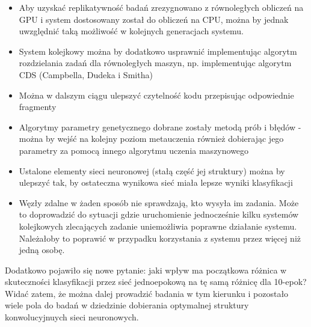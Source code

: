\begin{itemize}
  \item Aby uzyskać replikatywność badań zrezygnowano z równoległych obliczeń na GPU i system dostosowany został do obliczeń na CPU, można by jednak uwzględnić taką możliwość w kolejnych generacjach systemu.
  \item System kolejkowy można by dodatkowo usprawnić implementując algorytm rozdzielania zadań dla równoległych maszyn, np. implementując algorytm CDS (Campbella, Dudeka i Smitha)
  \item Można w dalszym ciągu ulepszyć czytelność kodu przepisując odpowiednie fragmenty
  \item Algorytmy parametry genetycznego dobrane zostały metodą prób i błędów - można by wejść na kolejny poziom metauczenia również dobierając jego parametry za pomocą innego algorytmu uczenia maszynowego\
  \item Ustalone elementy sieci neuronowej (stałą część jej struktury) można by ulepszyć tak, by ostateczna wynikowa sieć miała lepsze wyniki klasyfikacji
  \item Węzły zdalne w żaden sposób nie sprawdzają, kto wysyła im zadania.
  Może to doprowadzić do sytuacji gdzie uruchomienie jednocześnie kilku systemów kolejkowych zlecających zadanie uniemożliwia poprawne działanie systemu.
  Należałoby to poprawić w przypadku korzystania z systemu przez więcej niż jedną osobę.
\end{itemize}

Dodatkowo pojawiło się nowe pytanie: jaki wpływ ma początkowa różnica w skuteczności klasyfikacji przez sieć jednoepokową na tę samą różnicę dla 10-epok?
Widać zatem, że można dalej prowadzić badania w tym kierunku i pozostało wiele pola do badań w dziedzinie dobierania optymalnej struktury konwolucyjnuych sieci neuronowych.
